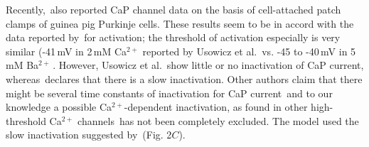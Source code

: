 \documentclass[12pt]{article}
\begin{document}
Recently,\,\cite{Usowicz:1992bh, Usowicz:1992qf} also reported CaP channel data on the basis of cell-attached patch clamps of guinea pig Purkinje cells. These results seem to be in accord with the data reported by\,\cite{Regan:1991ly} for activation; the threshold of activation especially is very similar (-41\,mV in 2\,mM Ca$^{2+}$ reported by Usowicz et al.\,\cite{Usowicz:1992bh} vs. -45 to -40\,mV in 5\,mM Ba$^{2+}$\,\cite{Regan:1991ly}. However, Usowicz et al.\,\cite{Usowicz:1992qf} show little or no inactivation of CaP current, whereas\,\cite{Regan:1991ly} declares that there is a slow inactivation. Other authors claim that there might be several time constants of inactivation for CaP current\,\cite{Hockberger:1991dq} and to our knowledge a possible Ca$^{2+}$-dependent inactivation, as found in other high-threshold Ca$^{2+}$ channels\,\cite{Fox:1987zr} has not been completely excluded. The model used the slow inactivation suggested by\,\cite{Regan:1991ly} (Fig. 2$C$).



\end{document}
